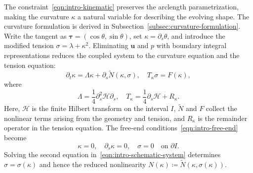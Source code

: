 \documentclass[11pt,reqno]{amsart}
\theoremstyle{plain}
\theoremstyle{definition}
\numberwithin{equation}{section}
\newcommand{\p}{\partial}
\newcommand{\mc}[1]{\mathcal{#1}}
\newcommand{\wt}[1]{\widetilde{#1}}
\newcommand{\bm}[1]{\boldsymbol{#1}}
\begin{document}
The constraint~\eqref{eqn:intro-kinematic} preserves the arclength parametrization, making the curvature $\kappa$ a natural variable for describing the evolving shape.
The curvature formulation is derived in Subsection~\ref{subsec:curvature-formulation}.
Write the tangent as
$\bm\tau=(\cos\theta,\sin\theta)$, set $\kappa=\p_s\theta$, and introduce the
modified tension $\sigma=\lambda+\kappa^2$.  Eliminating $\bm u$ and $p$ with boundary integral representations reduces the coupled system to the curvature equation and the tension equation:
\begin{equation}\label{eqn:intro-schematic-system}
    \p_t\kappa=\Lambda\kappa+\p_s\wt N(\kappa,\sigma),
    \quad
    T_\kappa\sigma=F(\kappa),
\end{equation}
where
\begin{equation}\label{eqn:intro-principal-operators}
    \Lambda=\frac14\p_s^2\mc H\p_s,
    \quad
    T_\kappa=\frac14\p_s\mc H+R_\kappa.
\end{equation}
Here, $\mc H$ is the finite Hilbert transform on the interval $I$, $\wt N$ and $F$ collect the nonlinear terms arising from the geometry and tension, and $R_\kappa$ is the
remainder operator in the tension equation.
The free-end conditions~\eqref{eqn:intro-free-end} become
\begin{equation}\label{eqn:cur-bc}
    \kappa=0,\quad \p_s\kappa=0,\quad \sigma=0
    \quad\text{on }\p I.
\end{equation}
Solving the second equation in~\eqref{eqn:intro-schematic-system} determines $\sigma=\sigma(\kappa)$ and hence
the reduced nonlinearity
$N(\kappa)\coloneqq\wt N(\kappa,\sigma(\kappa))$.






\end{document}
